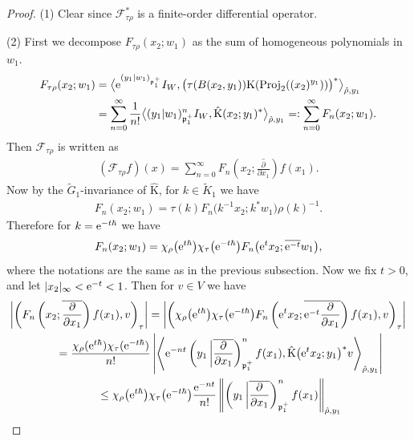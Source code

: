 \documentclass[pdftex]{sigma}
\numberwithin{equation}{section}
\newcommand{\fp}{\mathfrak{p}}
\newcommand{\cF}{\mathcal{F}}
\newcommand{\rK}{\mathrm{K}}
\newcommand{\Proj}{\operatorname{Proj}}
\begin{document}
\begin{proof}
(1) Clear since $\cF_{\tau\rho}^*$ is a finite-order differential operator.

(2) First we decompose $F_{\tau\rho}(x_2;w_1)$ as the sum of homogeneous polynomials in $w_1$.
\begin{align*}
F_{\tau\rho}(x_2;w_1) &=\big\langle {\rm e}^{(y_1|w_1)_{\fp^+_1}}I_W,\bigl(\tau(B(x_2,y_1))\rK(\Proj_2((x_2)^{y_1}))\bigr)^*\big\rangle_{\hat{\rho},y_1} \\
&=\sum_{n=0}^\infty \frac{1}{n!}\big\langle (y_1|w_1)_{\fp^+_1}^nI_W, \hat{\rK}(x_2;y_1)^*\big\rangle_{\hat{\rho},y_1} =:\sum_{n=0}^\infty F_n(x_2;w_1).
\end{align*}
Then $\cF_{\tau\rho}$ is written as
\begin{gather*} (\cF_{\tau\rho}f)(x)=\sum_{n=0}^\infty F_n\left(x_2;\overline{\frac{\partial}{\partial x_1}}\right)f(x_1). \end{gather*}
Now by the $\tilde{G}_1$-invariance of $\hat{\rK}$, for $k\in \tilde{K}_1$ we have
\begin{gather*} F_n(x_2;w_1)=\tau(k)F_n\big(k^{-1}x_2;k^*w_1\big)\rho(k)^{-1}. \end{gather*}
Therefore for $k={\rm e}^{-t\hbar}$ we have
\begin{gather}\label{invariance_Fn}
F_n(x_2;w_1)=\chi_\rho\big({\rm e}^{t\hbar}\big)\chi_\tau\big({\rm e}^{-t\hbar}\big) F_n\big({\rm e}^tx_2;\overline{{\rm e}^{-t}}w_1\big),
\end{gather}
where the notations are the same as in the previous subsection.
Now we fix $t>0$, and let $|x_2|_\infty<{\rm e}^{-t}<1$. Then for $v\in V$ we have
\begin{gather*}
 \left|\left(F_n\left(x_2;\overline{\frac{\partial}{\partial x_1}}\right)f(x_1),v\right)_\tau\right| =\left|\left(\chi_\rho\big({\rm e}^{t\hbar}\big)\chi_\tau\big({\rm e}^{-t\hbar}\big)
F_n\left({\rm e}^tx_2;\overline{{\rm e}^{-t}\frac{\partial}{\partial x_1}}\right)f(x_1),v\right)_\tau\right| \\
\qquad{} =\frac{\chi_\rho({\rm e}^{t\hbar})\chi_\tau({\rm e}^{-t\hbar})}{n!}\left|\left\langle {\rm e}^{-nt}
\left(y_1\,\middle|\overline{\frac{\partial}{\partial x_1}}\right)_{\fp^+_1}^nf(x_1),
\hat{\rK}\big({\rm e}^tx_2;y_1\big)^*v\right\rangle_{\hat{\rho},y_1}\right| \\
\qquad{} \le \chi_\rho\big({\rm e}^{t\hbar}\big)\chi_\tau\big({\rm e}^{-t\hbar}\big)\frac{{\rm e}^{-nt}}{n!}
\left\Vert\left(y_1\,\middle|\overline{\frac{\partial}{\partial x_1}}\right)_{\fp^+_1}^nf(x_1)\right\Vert_{\hat{\rho},y_1}

\end{gather*}
\end{proof}
\end{document}
